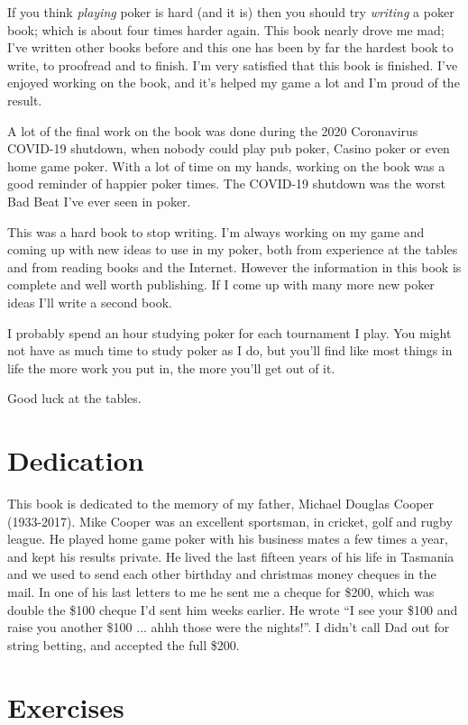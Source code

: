 If you think \textit{playing} poker is hard (and it is) then you should try
\textit{writing} a poker book; which is about four times harder
again. This book nearly drove me mad; I've written other books before
and this one has been by far the hardest book to write, to proofread
and to finish. I'm very satisfied that this book is finished. I've
enjoyed working on the book, and it's helped my game a lot and I'm
proud of the result.

A lot of the final work on the book was done during the 2020
Coronavirus COVID-19 shutdown, when nobody could play pub poker,
Casino poker or even home game poker. With a lot of time on my hands,
working on the book was a good reminder of happier poker times. The
COVID-19 shutdown was the worst Bad Beat I've ever seen in poker.

This was a hard book to stop writing. I'm always working on my game
and coming up with new ideas to use in my poker, both from experience
at the tables and from reading books and the Internet. However the
information in this book is complete and well worth
publishing. If I come up with many more new poker ideas I'll write
a second book.

I probably spend an hour studying poker for each tournament I play.
You might not have as much time to study poker as I do, but you'll
find like most things in life the more work you put in, the
more you'll get out of it.

Good luck at the tables.

\section{Dedication}

This book is dedicated to the memory of my father,
Michael Douglas Cooper (1933-2017). Mike Cooper was an excellent
sportsman, in cricket, golf and rugby league. He played home game
poker with his business mates a few times a year, and kept his results
private. He lived the last fifteen years of his life in Tasmania and
we used to send each other birthday and christmas money cheques in the
mail. In one of his last letters to me he sent me a cheque for \$200,
which was double the \$100 cheque I'd sent him weeks earlier. He wrote
``I see your \$100 and raise you another \$100 ... ahhh those were the
nights!''. I didn't call Dad out for string betting, and accepted the
full \$200.

\section{Exercises}


